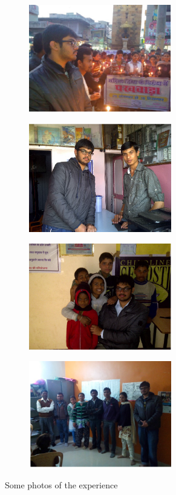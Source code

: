 \begin{figure}
	\centering
	\begin{subfigure}{.5\textwidth}
	  	\centering
	  	\includegraphics[width=2.45in]{Appendix1/im5.PNG}
	\end{subfigure}%
	\begin{subfigure}{.5\textwidth}
	  	\centering
	  	\includegraphics[width=2.45in]{Appendix1/im6.PNG}
	\end{subfigure}
	\label{figstart}
\end{figure}

\begin{figure}
	\centering
	\begin{subfigure}{.5\textwidth}
	  	\centering
	  	\includegraphics[width=2.45in]{Appendix1/im7.PNG}
	\end{subfigure}%
	\begin{subfigure}{.5\textwidth}
	  	\centering
	  	\includegraphics[width=2.45in]{Appendix1/im8.PNG}
	\end{subfigure}
	\caption{Some photos of the experience}
	\label{figstart}
\end{figure}



